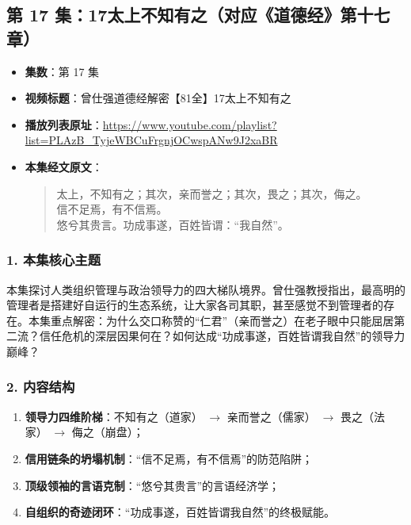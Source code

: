 \clearpage

\subsection{第 17 集：17太上不知有之（对应《道德经》第十七章）}
\label{sec:ep17}

\begin{itemize}
    \item \textbf{集数}：第 17 集
    \item \textbf{视频标题}：曾仕强道德经解密【81全】17太上不知有之
    \item \textbf{播放列表原址}：\url{https://www.youtube.com/playlist?list=PLAzB_TyjeWBCuFrgnjOCwspANw9J2xaBR}
    \item \textbf{本集经文原文}：
    \begin{quote}\kaishu
    太上，不知有之；其次，亲而誉之；其次，畏之；其次，侮之。\\
    信不足焉，有不信焉。\\
    悠兮其贵言。功成事遂，百姓皆谓：“我自然”。
    \end{quote}
\end{itemize}

\subsubsection{1. 本集核心主题}
本集探讨人类组织管理与政治领导力的四大梯队境界。曾仕强教授指出，最高明的管理者是搭建好自运行的生态系统，让大家各司其职，甚至感觉不到管理者的存在。本集重点解密：为什么交口称赞的“仁君”（亲而誉之）在老子眼中只能屈居第二流？信任危机的深层因果何在？如何达成“功成事遂，百姓皆谓我自然”的领导力巅峰？

\subsubsection{2. 内容结构}
\begin{enumerate}
    \item \textbf{领导力四维阶梯}：不知有之（道家） $\rightarrow$ 亲而誉之（儒家） $\rightarrow$ 畏之（法家） $\rightarrow$ 侮之（崩盘）；
    \item \textbf{信用链条的坍塌机制}：“信不足焉，有不信焉”的防范陷阱；
    \item \textbf{顶级领袖的言语克制}：“悠兮其贵言”的言语经济学；
    \item \textbf{自组织的奇迹闭环}：“功成事遂，百姓皆谓我自然”的终极赋能。
\end{enumerate}

